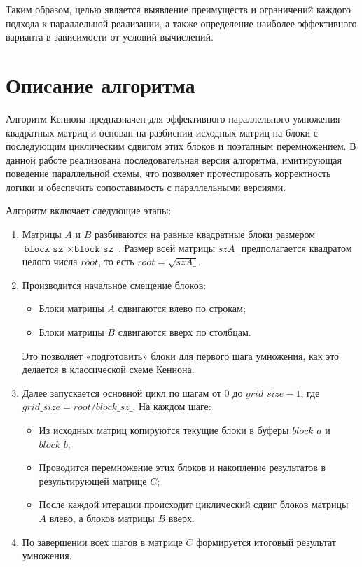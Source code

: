 \documentclass[12pt]{article}
\begin{document}
Таким образом, целью является выявление преимуществ и ограничений каждого подхода к параллельной реализации, а также определение наиболее эффективного варианта в зависимости от условий вычислений.

\newpage

\section*{Описание алгоритма}

Алгоритм Кеннона предназначен для эффективного параллельного умножения квадратных матриц и основан на разбиении исходных матриц на блоки с последующим циклическим сдвигом этих блоков и поэтапным перемножением. В данной работе реализована последовательная версия алгоритма, имитирующая поведение параллельной схемы, что позволяет протестировать корректность логики и обеспечить сопоставимость с параллельными версиями.

Алгоритм включает следующие этапы:

\begin{enumerate}
    \item Матрицы \( A \) и \( B \) разбиваются на равные квадратные блоки размером \( \texttt{block\_sz\_} \times \texttt{block\_sz\_} \). Размер всей матрицы \( szA\_ \) предполагается квадратом целого числа \( root \), то есть \( root = \sqrt{szA\_} \).
    
    \item Производится начальное смещение блоков:
    \begin{itemize}
        \item Блоки матрицы \( A \) сдвигаются влево по строкам;
        \item Блоки матрицы \( B \) сдвигаются вверх по столбцам.
    \end{itemize}
    Это позволяет «подготовить» блоки для первого шага умножения, как это делается в классической схеме Кеннона.

    \item Далее запускается основной цикл по шагам от 0 до \( grid\_size - 1 \), где \( grid\_size = root / block\_sz\_ \). На каждом шаге:
    \begin{itemize}
        \item Из исходных матриц копируются текущие блоки в буферы \( block\_a \) и \( block\_b \);
        \item Проводится перемножение этих блоков и накопление результатов в результирующей матрице \( C \);
        \item После каждой итерации происходит циклический сдвиг блоков матрицы \( A \) влево, а блоков матрицы \( B \) вверх.
    \end{itemize}
    
    \item По завершении всех шагов в матрице \( C \) формируется итоговый результат умножения.
\end{enumerate}
\end{document}
